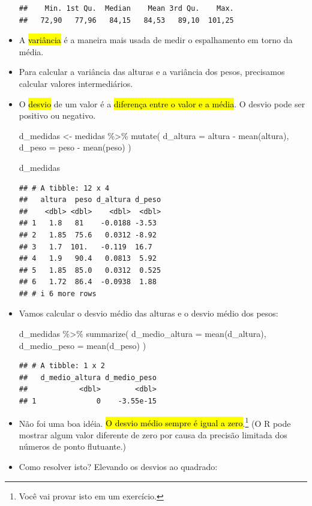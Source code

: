 \documentclass[
  11pt]{report}
\newenvironment{Shaded}{\begin{snugshade}}{\end{snugshade}}
\newcommand{\AttributeTok}[1]{\textcolor[rgb]{0.77,0.63,0.00}{#1}}
\newcommand{\FunctionTok}[1]{\textcolor[rgb]{0.00,0.00,0.00}{#1}}
\newcommand{\NormalTok}[1]{#1}
\newcommand{\OtherTok}[1]{\textcolor[rgb]{0.56,0.35,0.01}{#1}}
\newcommand{\SpecialCharTok}[1]{\textcolor[rgb]{0.00,0.00,0.00}{#1}}
\renewenvironment{Shaded}{
    \begin{mdframed}[%
      roundcorner=2pt,%
      innerleftmargin=5pt,%
      innerrightmargin=5pt,%
      topline=true,%
      leftline=true,%
      rightline=true,%
      bottomline=true,%
      linewidth=0.5pt,%
      linecolor=black!20,%
      backgroundcolor=black!2,%
      skipabove=2ex,%
      skipbelow=2.5ex%
    ]%
  }
  {
    \end{mdframed}
  }
\begin{document}
\begin{itemize}
\begin{verbatim}
##    Min. 1st Qu.  Median    Mean 3rd Qu.    Max. 
##   72,90   77,96   84,15   84,53   89,10  101,25
\end{verbatim}
\item
  A {\hl{variância}} é a maneira mais usada de medir o espalhamento em torno da média.
\item
  Para calcular a variância das alturas e a variância dos pesos, precisamos calcular valores intermediários.
\item
  O {\hl{desvio}} de um valor é a {\hl{diferença entre o valor e a média}}. O desvio pode ser positivo ou negativo.

\begin{Shaded}
\begin{Highlighting}[]
\NormalTok{d\_medidas }\OtherTok{\textless{}{-}}\NormalTok{ medidas }\SpecialCharTok{\%\textgreater{}\%} 
  \FunctionTok{mutate}\NormalTok{(}
    \AttributeTok{d\_altura =}\NormalTok{ altura }\SpecialCharTok{{-}} \FunctionTok{mean}\NormalTok{(altura),}
    \AttributeTok{d\_peso =}\NormalTok{ peso }\SpecialCharTok{{-}} \FunctionTok{mean}\NormalTok{(peso)}
\NormalTok{  )}

\NormalTok{d\_medidas}
\end{Highlighting}
\end{Shaded}

\begin{verbatim}
## # A tibble: 12 x 4
##   altura  peso d_altura d_peso
##    <dbl> <dbl>    <dbl>  <dbl>
## 1   1.8   81    -0.0188 -3.53 
## 2   1.85  75.6   0.0312 -8.92 
## 3   1.7  101.   -0.119  16.7  
## 4   1.9   90.4   0.0813  5.92 
## 5   1.85  85.0   0.0312  0.525
## 6   1.72  86.4  -0.0938  1.88 
## # i 6 more rows
\end{verbatim}
\item
  Vamos calcular o desvio médio das alturas e o desvio médio dos pesos:

\begin{Shaded}
\begin{Highlighting}[]
\NormalTok{d\_medidas }\SpecialCharTok{\%\textgreater{}\%} 
  \FunctionTok{summarize}\NormalTok{(}
    \AttributeTok{d\_medio\_altura =} \FunctionTok{mean}\NormalTok{(d\_altura),}
    \AttributeTok{d\_medio\_peso =} \FunctionTok{mean}\NormalTok{(d\_peso)}
\NormalTok{  )}
\end{Highlighting}
\end{Shaded}

\begin{verbatim}
## # A tibble: 1 x 2
##   d_medio_altura d_medio_peso
##            <dbl>        <dbl>
## 1              0    -3.55e-15
\end{verbatim}
\item
  \protect\hypertarget{desvio-medio-zero}{}{} Não foi uma boa idéia. {\hl{O desvio médio sempre é igual a zero}}.\footnote{Você vai provar isto em um exercício.} (O R pode mostrar algum valor diferente de zero por causa da precisão limitada dos números de ponto flutuante.)
\item
  Como resolver isto? Elevando os desvios ao quadrado:


\end{itemize}
\end{document}

